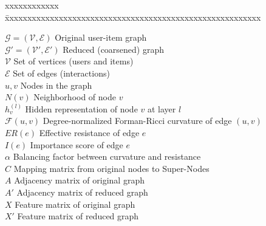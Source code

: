 \documentclass[BTech]{iiitdmdiss}
\begin{document}
\pagebreak

\notation
\noindent
\begin{singlespace}
\begin{tabbing}
xxxxxxxxxxxx \= xxxxxxxxxxxxxxxxxxxxxxxxxxxxxxxxxxxxxxxxxxxxxxxxxxxxxxxxx \kill

\textbf{$\mathcal{G} = (\mathcal{V}, \mathcal{E})$} \> Original user-item graph \\

\textbf{$\mathcal{G}' = (\mathcal{V}', \mathcal{E}')$} \> Reduced (coarsened) graph \\

\textbf{$\mathcal{V}$} \> Set of vertices (users and items) \\

\textbf{$\mathcal{E}$} \> Set of edges (interactions) \\

\textbf{$u, v$} \> Nodes in the graph \\

\textbf{$N(v)$} \> Neighborhood of node $v$ \\

\textbf{$h_v^{(l)}$} \> Hidden representation of node $v$ at layer $l$ \\

\textbf{$\mathcal{F}(u,v)$} \> Degree-normalized Forman-Ricci curvature of edge $(u,v)$ \\

\textbf{$ER(e)$} \> Effective resistance of edge $e$ \\

\textbf{$I(e)$} \> Importance score of edge $e$ \\

\textbf{$\alpha$} \> Balancing factor between curvature and resistance \\

\textbf{$C$} \> Mapping matrix from original nodes to Super-Nodes \\

\textbf{$A$} \> Adjacency matrix of original graph \\

\textbf{$A'$} \> Adjacency matrix of reduced graph \\

\textbf{$X$} \> Feature matrix of original graph \\

\textbf{$X'$} \> Feature matrix of reduced graph \\


\end{tabbing}
\end{singlespace}
\end{document}
